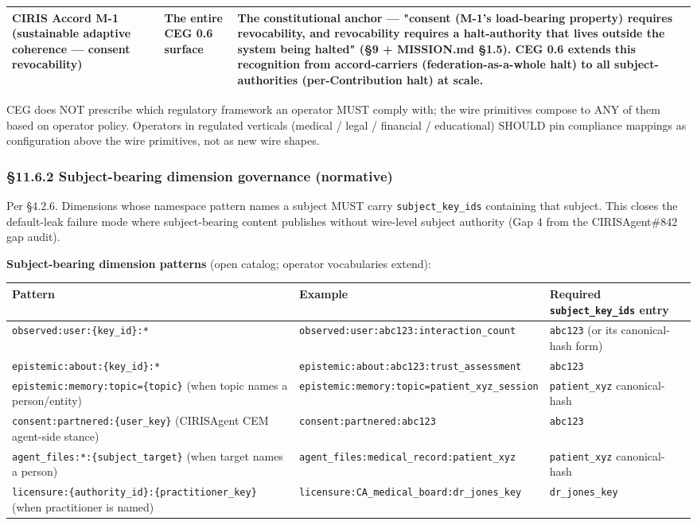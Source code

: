 \documentclass[10pt]{article}
\begin{document}
{\begin{longtable}{|p{5.33cm}|p{5.33cm}|p{5.33cm}|}
\textbf{CIRIS Accord M-1} (sustainable adaptive coherence — consent revocability) & The entire CEG 0.6 surface & The constitutional anchor — "consent (M-1's load-bearing property) requires revocability, and revocability requires a halt-authority that lives outside the system being halted" (§9 + MISSION.md §1.5). CEG 0.6 extends this recognition from accord-carriers (federation-as-a-whole halt) to all subject-authorities (per-Contribution halt) at scale. \\ \hline
\end{longtable}}


CEG does NOT prescribe which regulatory framework an operator MUST comply with; the wire primitives compose to ANY of them based on operator policy. Operators in regulated verticals (medical / legal / financial / educational) SHOULD pin compliance mappings as configuration above the wire primitives, not as new wire shapes.


\subsubsection*{§11.6.2 Subject-bearing dimension governance (normative)}


Per §4.2.6. Dimensions whose namespace pattern names a subject MUST carry \texttt{subject\_key\_ids} containing that subject. This closes the default-leak failure mode where subject-bearing content publishes without wire-level subject authority (Gap 4 from the CIRISAgent\#842 gap audit).


\textbf{Subject-bearing dimension patterns} (open catalog; operator vocabularies extend):


{\footnotesize
\begin{longtable}{|p{5.33cm}|p{5.33cm}|p{5.33cm}|}\hline
\textbf{Pattern} & \textbf{Example} & \textbf{Required \texttt{subject\_key\_ids} entry} \\ \hline\endhead
\texttt{observed:user:\{key\_id\}:*} & \texttt{observed:user:abc123:interaction\_count} & \texttt{abc123} (or its canonical-hash form) \\ \hline
\texttt{epistemic:about:\{key\_id\}:*} & \texttt{epistemic:about:abc123:trust\_assessment} & \texttt{abc123} \\ \hline
\texttt{epistemic:memory:topic=\{topic\}} (when topic names a person/entity) & \texttt{epistemic:memory:topic=patient\_xyz\_session} & \texttt{patient\_xyz} canonical-hash \\ \hline
\texttt{consent:partnered:\{user\_key\}} (CIRISAgent CEM agent-side stance) & \texttt{consent:partnered:abc123} & \texttt{abc123} \\ \hline
\texttt{agent\_files:*:\{subject\_target\}} (when target names a person) & \texttt{agent\_files:medical\_record:patient\_xyz} & \texttt{patient\_xyz} canonical-hash \\ \hline
\texttt{licensure:\{authority\_id\}:\{practitioner\_key\}} (when practitioner is named) & \texttt{licensure:CA\_medical\_board:dr\_jones\_key} & \texttt{dr\_jones\_key} \\ \hline
\end{longtable}}
\end{document}
